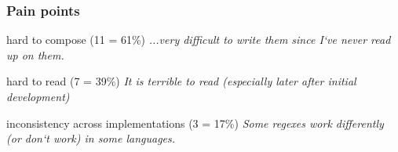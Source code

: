 %
%
%
%
%
%
%

\begin{frame}
\frametitle{Pain points}
\begin{block}{hard to compose (11 = 61\%)}
\emph{...very difficult to write them since I`ve never read up on them.}
\end{block}
\begin{block}{hard to read (7 = 39\%)}
\emph{It is terrible to read (especially later after initial development) }
\end{block}
\begin{block}{inconsistency across implementations (3 = 17\%)}
\emph{Some regexes work differently (or don`t work) in some languages.}
\end{block}
\end{frame}

